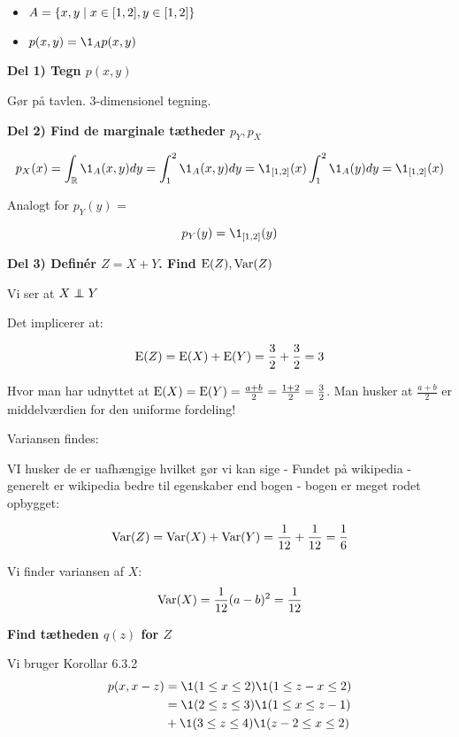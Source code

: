 \begin{itemize}
    \item $A = \left\{ x,y \mid x\in[1,2], y\in[1,2] \right\}$
    \item $p(x,y) = \1_A p(x,y)$
\end{itemize}

\textbf{Del 1) Tegn $p(x,y)$}

Gør på tavlen. 3-dimensionel tegning.

\textbf{Del 2) Find de marginale tætheder $p_Y, p_X$}

\begin{equation}
    p_X (x) = \int_{\R} \1_A(x,y) dy = \int_{1}^{2} \1_A(x,y) dy = \1_{[1,2]}(x) \int_{1}^{2} \1_A(y) dy = \1_{[1,2]}(x)
\end{equation}

Analogt for $p_Y(y)$ =

\begin{equation}
    p_Y(y) = \1_{[1,2]}(y)
\end{equation}


\textbf{Del 3) Definér $Z= X + Y$. Find $\text{E}(Z), \text{Var}(Z)$}

Vi ser at $X \independent Y$

Det implicerer at:

\begin{equation}
    \text{E}(Z) = \text{E}(X) + \text{E}(Y) = \frac{3}{2} + \frac{3}{2} = 3     
\end{equation}

Hvor man har udnyttet at $\text{E}(X) = \text{E}(Y) = \frac{a + b}{2} = \frac{1 +2 }{2} = \frac{3}{2}$. Man husker at $\frac{a + b}{2}$ er middelværdien for den uniforme fordeling!

Variansen findes:

VI husker de er uafhængige hvilket gør vi kan sige - Fundet på wikipedia - generelt er wikipedia bedre til egenskaber end bogen - bogen er meget rodet opbygget:

\begin{equation}
    \text{Var}(Z) = \text{Var}(X) + \text{Var}(Y) = \frac{1}{12} + \frac{1}{12} = \frac{1}{6}
\end{equation}

Vi finder variansen af $X$:
\begin{equation}
    \text{Var}(X) = \frac{1}{12}(a-b)^2 =\frac{1}{12}
\end{equation}

\textbf{Find tætheden $q(z)$ for $Z$}

Vi bruger Korollar 6.3.2
\begin{align}
    p(x, x - z) &= \1(1 \leq x \leq 2) \1(1 \leq z- x \leq 2) \\
    &= \1(2 \leq z \leq 3) \1(1 \leq x \leq z-1) \\
    &+ \1(3 \leq z \leq 4) \1(z-2 \leq x  \leq 2)
\end{align}


